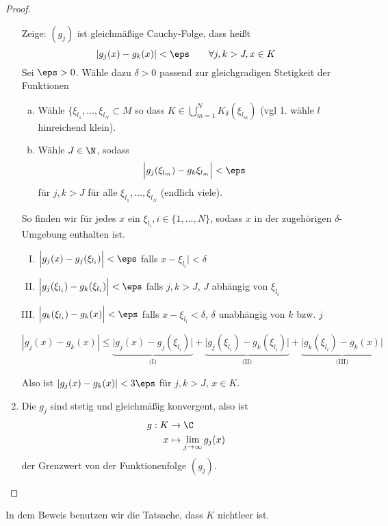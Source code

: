 \begin{st}
\begin{proof}
\begin{enumerate}[1)]
					Zeige: $(g_j)$ ist gleichmäßige Cauchy-Folge, dass heißt
					\[
						|g_j(x) - g_k(x)| < \eps
						\qquad \forall j,k > J, x \in K
					\]
					Sei $ \eps>0 $. Wähle dazu $ \delta >0 $ passend zur gleichgradigen Stetigkeit der Funktionen
					\begin{enumerate}[a)]
						\item
							Wähle $\{\xi_{l_1}, \dotsc, \xi_{l_N} \subset M$ so dass $K \in \bigcup_{m=1}^N K_\delta (\xi_{l_m})$ (vgl 1. wähle $l$ hinreichend klein).
						\item
							Wähle $J \in \N$, sodass 
							\[
								\Big| g_j(\xi_{l_m}) - g_k{\xi_{l_m}} \Big| < \eps
							\]
							für $j,k > J$ für alle $\xi_{l_1}, \dotsc, \xi_{l_N}$ (endlich viele).
					\end{enumerate}
					So finden wir für jedes $ x $ ein $ \xi_{l_i}, i\in\{1,...,N\} $, sodass $ x $ in der zugehörigen $\delta $-Umgebung enthalten ist.
					\begin{enumerate}[(I)]
					\item $\Big|g_j(x)-g_j(\xi_{l_i})\Big|< \eps$ falls $x-\xi_{l_i}|<\delta$
					\item $ \Big|g_j(\xi_{l_i}) - g_k(\xi_{l_i})\Big| <\eps$ falls $j,k > J$, $J$ abhängig von $\xi_{l_i}$
					\item $ \Big| g_k(\xi_{l_i}) - g_k(x)\Big| <\eps$ falls $x-\xi_{l_i} < \delta$, $\delta$ unabhängig von $k$ bzw. $j$
					\end{enumerate}
					\[
						|g_j(x) - g_k(x)| 
						\le \underbrace{\Big|g_j(x)-g_j(\xi_{l_i})\Big|}_{\text{(I)}} 
						+ \underbrace{\Big|g_j(\xi_{l_i}) - g_k(\xi_{l_i})\Big|}_{\text{(II)}}  + \underbrace{\Big| g_k(\xi_{l_i}) - g_k(x)\Big|}_{\text{(III)}} 
					\]
					
					Also ist $|g_j(x) - g_k(x)| < 3 \eps$ für $j,k > J$, $x\in K$.
				
			\item
				Die $g_j$ sind stetig und gleichmäßig konvergent, also ist
				\begin{align*}
					g: K &\to \C \\
					x &\mapsto \lim_{j\to \infty} g_j(x)
				\end{align*}
				der Grenzwert von der Funktionenfolge $ (g_j) $.
		\end{enumerate}
	\end{proof}
\end{st}
\begin{note}
In dem Beweis benutzen wir die Tatsache, dass $ K $ nichtleer ist.
\end{note}
